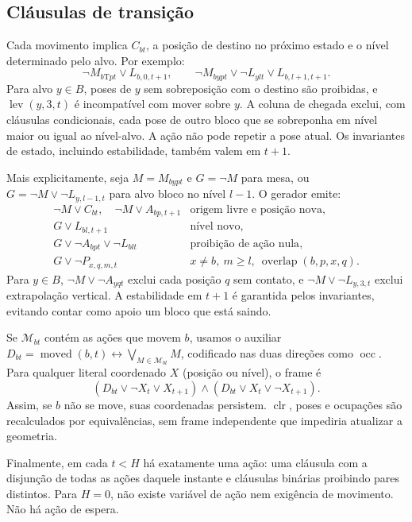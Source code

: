 \documentclass[11pt,a4paper]{article}
\newcommand{\lev}{\operatorname{lev}}
\newcommand{\clr}{\operatorname{clr}}
\newcommand{\occ}{\operatorname{occ}}
\newcommand{\Ov}{\operatorname{overlap}}
\newcommand{\T}{\mathrm{T}}
\begin{document}
\subsection{Cláusulas de transição}
Cada movimento implica $C_{bt}$, a posição de destino no próximo estado e o nível determinado pelo alvo. Por exemplo:
\[
\neg M_{b\T pt}\lor L_{b,0,t+1},\qquad
\neg M_{bypt}\lor\neg L_{ylt}\lor L_{b,l+1,t+1}.
\]
Para alvo $y\in B$, poses de $y$ sem sobreposição com o destino são proibidas, e $\lev(y,3,t)$ é incompatível com mover sobre $y$. A coluna de chegada exclui, com cláusulas condicionais, cada pose de outro bloco que se sobreponha em nível maior ou igual ao nível-alvo. A ação não pode repetir a pose atual. Os invariantes de estado, incluindo estabilidade, também valem em $t+1$.


Mais explicitamente, seja $M=M_{bypt}$ e $G=\neg M$ para mesa, ou $G=\neg M\lor\neg L_{y,l-1,t}$ para alvo bloco no nível $l-1$. O gerador emite:
\[
\begin{array}{ll}
\neg M\lor C_{bt},\quad\neg M\lor A_{bp,t+1} & \text{origem livre e posição nova},\\
G\lor L_{bl,t+1} & \text{nível novo},\\
G\lor\neg A_{bpt}\lor\neg L_{blt} & \text{proibição de ação nula},\\
G\lor\neg P_{x,q,m,t} & x\ne b,\ m\ge l,\ \Ov(b,p,x,q).
\end{array}
\]
Para $y\in B$, $\neg M\lor\neg A_{yqt}$ exclui cada posição $q$ sem contato, e $\neg M\lor\neg L_{y,3,t}$ exclui extrapolação vertical. A estabilidade em $t+1$ é garantida pelos invariantes, evitando contar como apoio um bloco que está saindo.

Se $\mathcal M_{bt}$ contém as ações que movem $b$, usamos o auxiliar
$D_{bt}=\operatorname{moved}(b,t)\leftrightarrow\bigvee_{M\in\mathcal M_{bt}}M$,
codificado nas duas direções como $\occ$. Para qualquer literal coordenado $X$ (posição ou nível), o frame é
\[
(D_{bt}\lor\neg X_t\lor X_{t+1})\land
(D_{bt}\lor X_t\lor\neg X_{t+1}).
\]
Assim, se $b$ não se move, suas coordenadas persistem. $\clr$, poses e ocupações são recalculados por equivalências, sem frame independente que impediria atualizar a geometria.

Finalmente, em cada $t<H$ há exatamente uma ação: uma cláusula com a disjunção de todas as ações daquele instante e cláusulas binárias proibindo pares distintos. Para $H=0$, não existe variável de ação nem exigência de movimento. Não há ação de espera.
\end{document}
